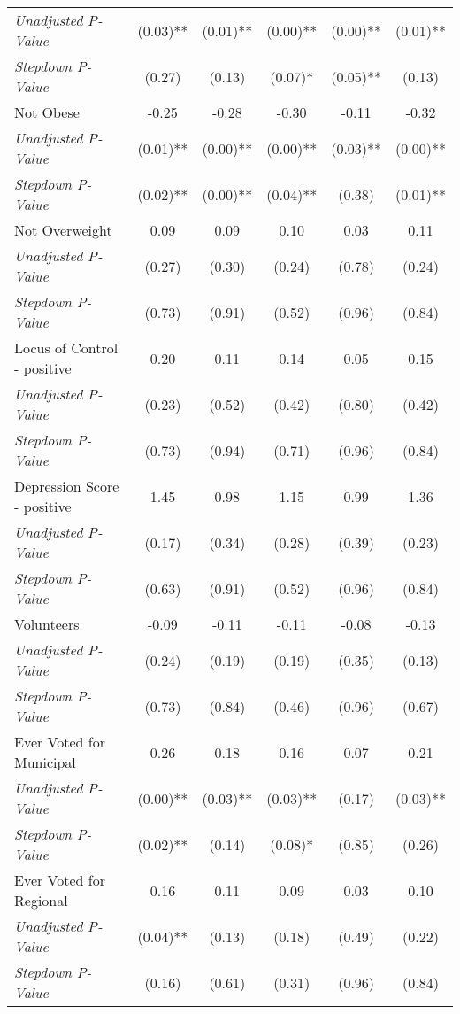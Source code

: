 \begin{tabular}{l c c c c c}
\quad \textit{Unadjusted P-Value} & (0.03)** & (0.01)** & (0.00)** & (0.00)** & (0.01)** \\
\quad \textit{Stepdown P-Value} & (0.27) & (0.13) & (0.07)* & (0.05)** & (0.13) \\
Not Obese & -0.25 & -0.28 & -0.30 & -0.11 & -0.32 \\
\quad \textit{Unadjusted P-Value} & (0.01)** & (0.00)** & (0.00)** & (0.03)** & (0.00)** \\
\quad \textit{Stepdown P-Value} & (0.02)** & (0.00)** & (0.04)** & (0.38) & (0.01)** \\
Not Overweight & 0.09 & 0.09 & 0.10 & 0.03 & 0.11 \\
\quad \textit{Unadjusted P-Value} & (0.27) & (0.30) & (0.24) & (0.78) & (0.24) \\
\quad \textit{Stepdown P-Value} & (0.73) & (0.91) & (0.52) & (0.96) & (0.84) \\
Locus of Control - positive & 0.20 & 0.11 & 0.14 & 0.05 & 0.15 \\
\quad \textit{Unadjusted P-Value} & (0.23) & (0.52) & (0.42) & (0.80) & (0.42) \\
\quad \textit{Stepdown P-Value} & (0.73) & (0.94) & (0.71) & (0.96) & (0.84) \\
Depression Score - positive & 1.45 & 0.98 & 1.15 & 0.99 & 1.36 \\
\quad \textit{Unadjusted P-Value} & (0.17) & (0.34) & (0.28) & (0.39) & (0.23) \\
\quad \textit{Stepdown P-Value} & (0.63) & (0.91) & (0.52) & (0.96) & (0.84) \\
Volunteers & -0.09 & -0.11 & -0.11 & -0.08 & -0.13 \\
\quad \textit{Unadjusted P-Value} & (0.24) & (0.19) & (0.19) & (0.35) & (0.13) \\
\quad \textit{Stepdown P-Value} & (0.73) & (0.84) & (0.46) & (0.96) & (0.67) \\
Ever Voted for Municipal & 0.26 & 0.18 & 0.16 & 0.07 & 0.21 \\
\quad \textit{Unadjusted P-Value} & (0.00)** & (0.03)** & (0.03)** & (0.17) & (0.03)** \\
\quad \textit{Stepdown P-Value} & (0.02)** & (0.14) & (0.08)* & (0.85) & (0.26) \\
Ever Voted for Regional & 0.16 & 0.11 & 0.09 & 0.03 & 0.10 \\
\quad \textit{Unadjusted P-Value} & (0.04)** & (0.13) & (0.18) & (0.49) & (0.22) \\
\quad \textit{Stepdown P-Value} & (0.16) & (0.61) & (0.31) & (0.96) & (0.84) \\

\end{tabular}
